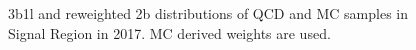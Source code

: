 \begin{figure}[ht]
 

    \caption{3b1l and reweighted 2b distributions of QCD and \ttbar MC samples in Signal Region in 2017.
             MC derived weights are used.}
    \label{fig:mc-weights-3b1l-SR-2017}
\end{figure}


